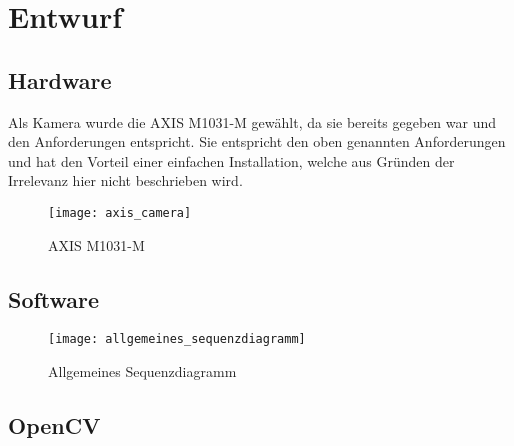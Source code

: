 \chapter{Entwurf}
\section{Hardware}
Als Kamera wurde die AXIS M1031-M gewählt, da sie bereits gegeben war und den Anforderungen entspricht. Sie entspricht den oben genannten Anforderungen und hat den Vorteil einer einfachen Installation, welche aus Gründen der Irrelevanz hier nicht beschrieben wird.

\begin{figure}
\centering
\texttt{[image: axis\_camera]} %
\caption[AXIS M1031-M]{AXIS M1031-M\footnotemark}
\label{fig:AXIS M1031-M}
\end{figure}

\section{Software}
\begin{figure}
\centering
\texttt{[image: allgemeines\_sequenzdiagramm]} %
\caption[Allgemeines Sequenzdiagramm]{Allgemeines Sequenzdiagramm}
\label{fig:Allgemeines Sequenzdiagramm}
\end{figure}

\section{OpenCV}
